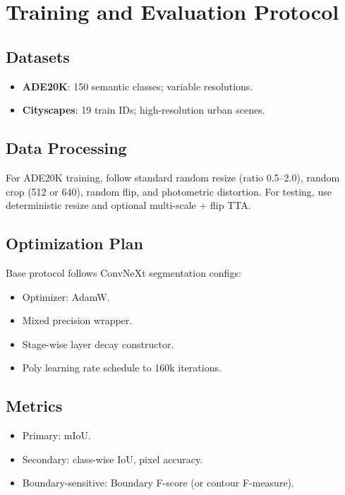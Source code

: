 \documentclass[11pt]{article}
\begin{document}
\section{Training and Evaluation Protocol}
\subsection{Datasets}
\begin{itemize}[leftmargin=1.4em]
    \item \textbf{ADE20K}: 150 semantic classes; variable resolutions.
    \item \textbf{Cityscapes}: 19 train IDs; high-resolution urban scenes.
\end{itemize}

\subsection{Data Processing}
For ADE20K training, follow standard random resize (ratio 0.5--2.0), random crop (512 or 640), random flip, and photometric distortion. For testing, use deterministic resize and optional multi-scale + flip TTA.

\subsection{Optimization Plan}
Base protocol follows ConvNeXt segmentation configs:
\begin{itemize}[leftmargin=1.4em]
    \item Optimizer: AdamW.
    \item Mixed precision wrapper.
    \item Stage-wise layer decay constructor.
    \item Poly learning rate schedule to 160k iterations.
\end{itemize}

\subsection{Metrics}
\begin{itemize}[leftmargin=1.4em]
    \item Primary: mIoU.
    \item Secondary: class-wise IoU, pixel accuracy.
    \item Boundary-sensitive: Boundary F-score (or contour F-measure).
\end{itemize}
\end{document}
